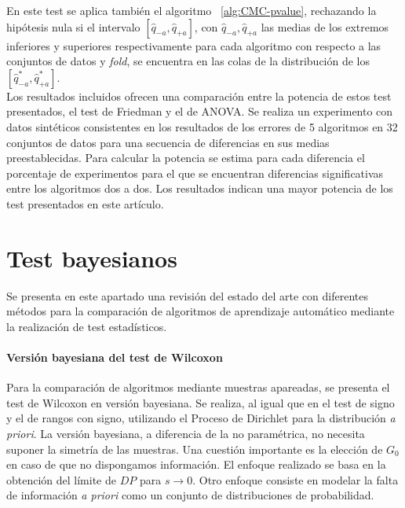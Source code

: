 	En este test se aplica también el algoritmo 
~\ref{alg:CMC-pvalue}, rechazando la hipótesis nula si el 
intervalo $[\hat{q}_{-a}, \hat{q}_{+a}]$, con $\hat{q}_{-a}, 
\hat{q}_{+a}$ las medias de los extremos inferiores y 
superiores respectivamente para cada algoritmo con respecto a 
las conjuntos de datos y \textit{fold}, se encuentra en las colas 
de la distribución de los $[\hat{q}_{-a}^*, \hat{q}_{+a}^*]$.
\\
	Los resultados incluidos ofrecen una comparación entre la 
potencia de estos test presentados, el test de Friedman y el 
de ANOVA. Se realiza un experimento con datos sintéticos 
consistentes en los resultados de los errores de 5 algoritmos 
en 32 conjuntos de datos para una secuencia de diferencias en sus 
medias preestablecidas. Para calcular la potencia se estima 
para cada diferencia el porcentaje de experimentos para el 
que se encuentran diferencias significativas entre los 
algoritmos dos a dos. Los resultados indican una mayor 
potencia de los test presentados en este artículo.


\section{Test bayesianos}

	Se presenta en este apartado una revisión del estado del 
arte con diferentes métodos para la comparación de algoritmos
de aprendizaje automático mediante la realización de test 
estadísticos. 

\paragraph{Versión bayesiana del test de Wilcoxon} 
\cite{DBLP:conf/icml/BenavoliCMZR14} Para la comparación de algoritmos mediante
muestras apareadas, se presenta el test de Wilcoxon en 
versión bayesiana. Se realiza, al igual que en el test
de signo y el de rangos con signo, utilizando el Proceso de
Dirichlet para la distribución \textit{a priori}. La versión 
bayesiana, a diferencia de la no paramétrica, no necesita 
suponer la simetría de las muestras. Una cuestión importante
es la elección de $G_0$ en caso de que no dispongamos
información. El enfoque realizado se basa en la obtención
del límite de $DP$ para $s \rightarrow 0$. Otro enfoque 
consiste en modelar la falta de información \textit{a priori} 
como un conjunto de distribuciones de probabilidad. 

